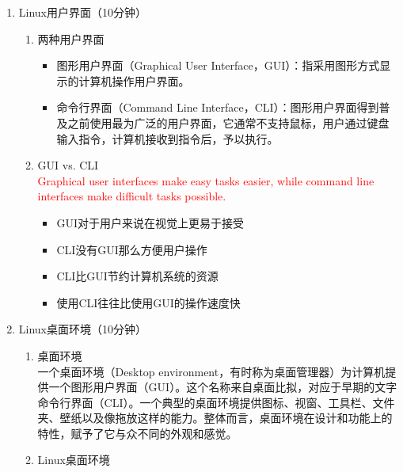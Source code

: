 \documentclass{TIJMUjiaoanSY}
\begin{document}

\firstTail


\newpage
\otherHeader

\noindent
\begin{enumerate}
  \item Linux用户界面（10分钟）
    \begin{enumerate}
      \item 两种用户界面
	\begin{itemize}
	  \item 图形用户界面（Graphical User Interface，GUI）：指采用图形方式显示的计算机操作用户界面。
	  \item 命令行界面（Command Line Interface，CLI）：图形用户界面得到普及之前使用最为广泛的用户界面，它通常不支持鼠标，用户通过键盘输入指令，计算机接收到指令后，予以执行。
	\end{itemize}
      \item GUI vs. CLI\\
	\vspace*{-10pt}
	\textcolor{red}{Graphical user interfaces make easy tasks easier, while command line interfaces make difficult tasks possible.}
	\begin{itemize}
	  \item GUI对于用户来说在视觉上更易于接受
	  \item CLI没有GUI那么方便用户操作
	  \item CLI比GUI节约计算机系统的资源
	  \item 使用CLI往往比使用GUI的操作速度快
	\end{itemize}
    \end{enumerate}
  \item Linux桌面环境（10分钟）
    \begin{enumerate}
      \item 桌面环境\\
	一个桌面环境（Desktop environment，有时称为桌面管理器）为计算机提供一个图形用户界面（GUI）。这个名称来自桌面比拟，对应于早期的文字命令行界面（CLI）。一个典型的桌面环境提供图标、视窗、工具栏、文件夹、壁纸以及像拖放这样的能力。整体而言，桌面环境在设计和功能上的特性，赋予了它与众不同的外观和感觉。
      \item Linux桌面环境
	\begin{itemize}

\end{itemize}
\end{enumerate}
\end{enumerate}
\end{document}
